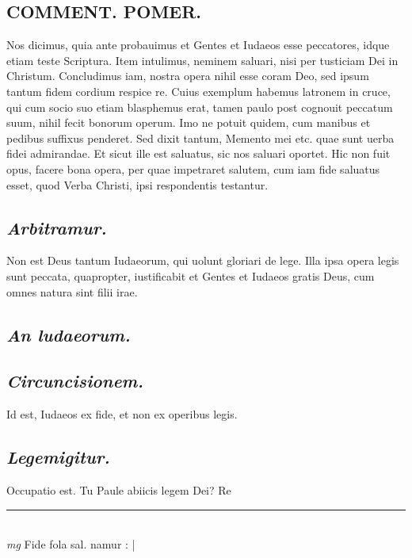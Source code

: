 \documentclass{article}
\begin{document}
\begin{pages}
\section*{COMMENT. POMER.  }\pstart Nos dicimus, quia ante probauimus et Gentes et Iudaeos esse peccatores, idque etiam teste Scriptura. Item intulimus, neminem saluari, nisi per tusticiam Dei in Christum. Concludimus iam, nostra opera nihil esse coram Deo, sed ipsum tantum fidem cordium respice re. Cuius exemplum habemus latronem in cruce, qui cum socio suo etiam blasphemus erat, tamen paulo post cognouit peccatum suum, nihil fecit bonorum operum. Imo ne potuit quidem, cum manibus et pedibus suffixus penderet. Sed dixit tantum, Memento mei etc. quae sunt uerba fidei admirandae. Et sicut ille est saluatus, sic nos saluari oportet. Hic non fuit opus, facere bona opera, per quae impetraret salutem, cum iam fide saluatus esset, quod Verba Christi, ipsi respondentis testantur.   \pend
{}
{}
\subsection*{\textit{Arbitramur. }}\pstart Non est Deus tantum Iudaeorum, qui uolunt gloriari de lege. Illa ipsa opera legis sunt peccata, quapropter, iustificabit et Gentes et Iudaeos gratis Deus, cum omnes natura sint filii irae.   \pend
{}
{}
\subsection*{\textit{An ludaeorum. }}
{}
\subsection*{\textit{Circuncisionem. }}\pstart Id est, Iudaeos ex fide, et non ex operibus legis.  \pend
{}
{}
\subsection*{\textit{Legemigitur. }}\pstart Occupatio est. Tu Paule abiicis legem Dei? Re\pend
\vspace{0.5cm}\noindent
\vspace{0.2cm}\rule{1cm}{0.2pt}\\ 
\hspace{0.2cm}\textit{mg}
\footnotesize Fide fola sal. namur : 
\normalsize| 

\end{pages}
\end{document}
